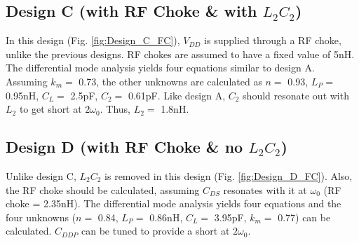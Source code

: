 \documentclass[conference]{IEEEtran}
\begin{document}
\subsection{Design C (with RF Choke \& with $L_2C_2$)}
In this design (Fig. \ref{fig:Design_C_FC}), $V_{DD}$ is supplied through a RF choke, unlike the previous designs. RF chokes are assumed to have a fixed value of 5nH. The differential mode analysis yields four equations similar to design A. Assuming $k_m=$ 0.73, the other unknowns are calculated as $n =$ 0.93, $L_P =$ 0.95nH, $C_L =$ 2.5pF, $C_2 =$ 0.61pF.
Like design A, $C_2$ should resonate out with $L_2$ to get short at $2\omega_0$. Thus, $L_2 =$ 1.8nH. 

\subsection{Design D (with RF Choke \& no $L_2C_2$)}
 Unlike design C, $L_2C_2$ is removed in this design (Fig. \ref{fig:Design_D_FC}). Also, the RF choke should be calculated, assuming $C_{DS}$ resonates with it at $\omega_0$ (RF choke = 2.35nH).
The differential mode analysis yields four equations and the four unknowns ($n =$ 0.84, $L_P =$ 0.86nH, $C_L =$ 3.95pF, $k_m=$ 0.77) can be calculated.
$C_{DDP}$ can be tuned to provide a short at $2\omega_0$.
\end{document}
